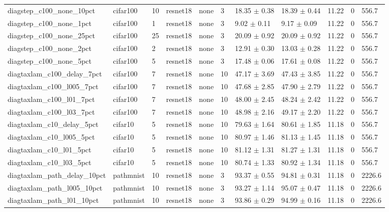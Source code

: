 \begin{tabular}{lllllllllll}
diagstep_c100_none_10pct & cifar100 & 10 & resnet18 & none & 3 & 18.35 $\pm$ 0.38 & 18.39 $\pm$ 0.44 & 11.22 & 0 & 556.7 \\
diagstep_c100_none_1pct & cifar100 & 1 & resnet18 & none & 3 & 9.02 $\pm$ 0.11 & 9.17 $\pm$ 0.09 & 11.22 & 0 & 556.7 \\
diagstep_c100_none_25pct & cifar100 & 25 & resnet18 & none & 3 & 20.09 $\pm$ 0.92 & 20.09 $\pm$ 0.92 & 11.22 & 0 & 556.7 \\
diagstep_c100_none_2pct & cifar100 & 2 & resnet18 & none & 3 & 12.91 $\pm$ 0.30 & 13.03 $\pm$ 0.28 & 11.22 & 0 & 556.7 \\
diagstep_c100_none_5pct & cifar100 & 5 & resnet18 & none & 3 & 17.48 $\pm$ 0.06 & 17.61 $\pm$ 0.08 & 11.22 & 0 & 556.7 \\
diagtaxlam_c100_delay_7pct & cifar100 & 7 & resnet18 & none & 10 & 47.17 $\pm$ 3.69 & 47.43 $\pm$ 3.85 & 11.22 & 0 & 556.7 \\
diagtaxlam_c100_l005_7pct & cifar100 & 7 & resnet18 & none & 10 & 47.68 $\pm$ 2.85 & 47.90 $\pm$ 2.79 & 11.22 & 0 & 556.7 \\
diagtaxlam_c100_l01_7pct & cifar100 & 7 & resnet18 & none & 10 & 48.00 $\pm$ 2.45 & 48.24 $\pm$ 2.42 & 11.22 & 0 & 556.7 \\
diagtaxlam_c100_l03_7pct & cifar100 & 7 & resnet18 & none & 10 & 48.98 $\pm$ 2.16 & 49.17 $\pm$ 2.20 & 11.22 & 0 & 556.7 \\
diagtaxlam_c10_delay_5pct & cifar10 & 5 & resnet18 & none & 10 & 79.63 $\pm$ 1.64 & 80.61 $\pm$ 1.85 & 11.18 & 0 & 556.7 \\
diagtaxlam_c10_l005_5pct & cifar10 & 5 & resnet18 & none & 10 & 80.97 $\pm$ 1.46 & 81.13 $\pm$ 1.45 & 11.18 & 0 & 556.7 \\
diagtaxlam_c10_l01_5pct & cifar10 & 5 & resnet18 & none & 10 & 81.12 $\pm$ 1.31 & 81.27 $\pm$ 1.31 & 11.18 & 0 & 556.7 \\
diagtaxlam_c10_l03_5pct & cifar10 & 5 & resnet18 & none & 10 & 80.74 $\pm$ 1.33 & 80.92 $\pm$ 1.34 & 11.18 & 0 & 556.7 \\
diagtaxlam_path_delay_10pct & pathmnist & 10 & resnet18 & none & 3 & 93.37 $\pm$ 0.55 & 94.81 $\pm$ 0.31 & 11.18 & 0 & 2226.6 \\
diagtaxlam_path_l005_10pct & pathmnist & 10 & resnet18 & none & 3 & 93.27 $\pm$ 1.14 & 95.07 $\pm$ 0.47 & 11.18 & 0 & 2226.6 \\
diagtaxlam_path_l01_10pct & pathmnist & 10 & resnet18 & none & 3 & 93.86 $\pm$ 0.29 & 94.99 $\pm$ 0.16 & 11.18 & 0 & 2226.6 \\

\end{tabular}
